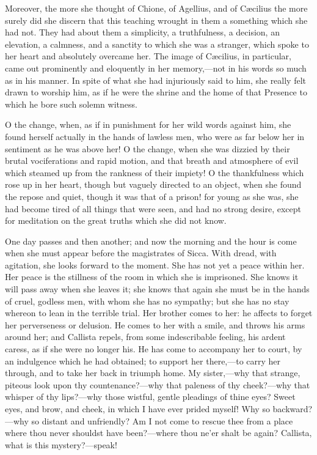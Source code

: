 Moreover, the more she thought of Chione, of Agellius, and of
Cæcilius the more surely did she discern that this teaching wrought
in them a something which she had not. They had about them a
simplicity, a truthfulness, a decision, an elevation, a calmness, and
a sanctity to which she was a stranger, which spoke to her heart and
absolutely overcame her. The image of Cæcilius, in particular, came
out prominently and eloquently in her memory,—not in his words so
much as in his manner. In spite of what she had injuriously said to
him, she really felt drawn to worship him, as if he were the shrine
and the home of that Presence to which he bore such solemn
witness.

O the change, when, as if in punishment for her wild words against
him, she found herself actually in the hands of lawless men, who were
as far below her in sentiment as he was above her! O the change, when
she was dizzied by their brutal vociferations and rapid motion, and
that breath and atmosphere of evil which steamed up from the rankness
of their impiety! O the thankfulness which rose up in her heart,
though but vaguely directed to an object, when she found the repose
and quiet, though it was that of a prison! for young as she was, she
had become tired of all things that were seen, and had no strong
desire, except for meditation on the great truths which she did not
know.

One day passes and then another; and now the morning and the hour
is come when she must appear before the magistrates of Sicca. With
dread, with agitation, she looks forward to the moment. She has not
yet a peace within her. Her peace is the stillness of the room in
which she is imprisoned. She knows it will pass away when she leaves
it; she knows that again she must be in the hands of cruel, godless
men, with whom she has no sympathy; but she has no stay whereon to
lean in the terrible trial. Her brother comes to her: he affects to
forget her perverseness or delusion. He comes to her with a smile, and
throws his arms around her; and Callista repels, from some
indescribable feeling, his ardent caress, as if she were no
longer his. He has come to accompany her to court, by an indulgence
which he had obtained; to support her there,—to carry her through,
and to take her back in triumph home. My sister,—why that strange,
piteous look upon thy countenance?—why that paleness of thy cheek?—why
that whisper of thy lips?—why those wistful, gentle pleadings of
thine eyes? Sweet eyes, and brow, and cheek, in which I have ever
prided myself! Why so backward?—why so distant and unfriendly? Am I
not come to rescue thee from a place where thou never shouldst have
been?—where thou ne'er shalt be again? Callista, what is this
mystery?—speak!

